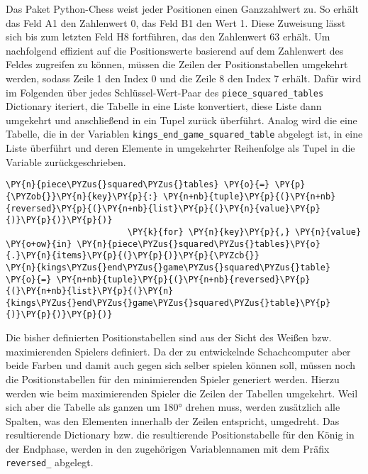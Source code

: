     Das Paket Python-Chess weist jeder Positionen einen Ganzzahlwert zu. So
erhält das Feld A1 den Zahlenwert 0, das Feld B1 den Wert 1. Diese
Zuweisung lässt sich bis zum letzten Feld H8 fortführen, das den
Zahlenwert 63 erhält. Um nachfolgend effizient auf die Positionswerte
basierend auf dem Zahlenwert des Feldes zugreifen zu können, müssen die
Zeilen der Positionstabellen umgekehrt werden, sodass Zeile 1 den Index
0 und die Zeile 8 den Index 7 erhält. Dafür wird im Folgenden über jedes
Schlüssel-Wert-Paar des \texttt{piece\_squared\_tables} Dictionary
iteriert, die Tabelle in eine Liste konvertiert, diese Liste dann
umgekehrt und anschließend in ein Tupel zurück überführt. Analog wird
die eine Tabelle, die in der Variablen
\texttt{kings\_end\_game\_squared\_table} abgelegt ist, in eine Liste
überführt und deren Elemente in umgekehrter Reihenfolge als Tupel in die
Variable zurückgeschrieben.

\bigskip

    \begin{tcolorbox}[fontupper=\linespread{.66}\selectfont, breakable, size=fbox, boxrule=1pt, pad at break*=1mm,colback=cellbackground, colframe=cellborder]
\begin{Verbatim}[commandchars=\\\{\}]
\PY{n}{piece\PYZus{}squared\PYZus{}tables} \PY{o}{=} \PY{p}{\PYZob{}}\PY{n}{key}\PY{p}{:} \PY{n+nb}{tuple}\PY{p}{(}\PY{n+nb}{reversed}\PY{p}{(}\PY{n+nb}{list}\PY{p}{(}\PY{n}{value}\PY{p}{)}\PY{p}{)}\PY{p}{)} 
                        \PY{k}{for} \PY{n}{key}\PY{p}{,} \PY{n}{value} \PY{o+ow}{in} \PY{n}{piece\PYZus{}squared\PYZus{}tables}\PY{o}{.}\PY{n}{items}\PY{p}{(}\PY{p}{)}\PY{p}{\PYZcb{}}
\PY{n}{kings\PYZus{}end\PYZus{}game\PYZus{}squared\PYZus{}table} \PY{o}{=} \PY{n+nb}{tuple}\PY{p}{(}\PY{n+nb}{reversed}\PY{p}{(}\PY{n+nb}{list}\PY{p}{(}\PY{n}{kings\PYZus{}end\PYZus{}game\PYZus{}squared\PYZus{}table}\PY{p}{)}\PY{p}{)}\PY{p}{)}
\end{Verbatim}
\end{tcolorbox}

    Die bisher definierten Positionstabellen sind aus der Sicht des Weißen
bzw. maximierenden Spielers definiert. Da der zu entwickelnde
Schachcomputer aber beide Farben und damit auch gegen sich selber
spielen können soll, müssen noch die Positionstabellen für den
minimierenden Spieler generiert werden. Hierzu werden wie beim
maximierenden Spieler die Zeilen der Tabellen umgekehrt. Weil sich aber
die Tabelle als ganzen um 180° drehen muss, werden zusätzlich alle
Spalten, was den Elementen innerhalb der Zeilen entspricht, umgedreht.
Das resultierende Dictionary bzw. die resultierende Positionstabelle für
den König in der Endphase, werden in den zugehörigen Variablennamen mit
dem Präfix \texttt{reversed\_} abgelegt.

